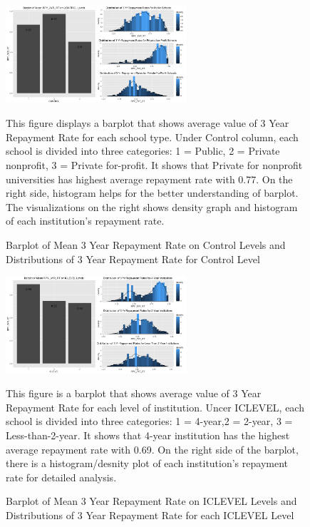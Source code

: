 \begin{figure}
  \centering
  \caption{Barplot of Mean 3 Year Repayment Rate on Control Levels and Distributions of 3 Year Repayment Rate for Control Level}
  \includegraphics[width=0.6\textwidth]{../images/eda/rpy3yr_control_barplot_histogram.png}
  \centering
  \newline
  
  \raggedright
This figure displays a barplot that shows average value of 3 Year Repayment Rate for each school type. Under Control column, each school is divided into three categories: 1 = Public, 2 = Private nonprofit, 3 = Private for-profit. It shows that Private for nonprofit universities has highest average repayment rate with 0.77. On the right side, histogram helps for the better understanding of barplot. The visualizations on the right shows density graph and histogram of each institution's repayment rate.
\end{figure}


\begin{figure}
  \caption{Barplot of Mean 3 Year Repayment Rate on ICLEVEL Levels and Distributions of 3 Year Repayment Rate for each ICLEVEL Level}
  \centering
  \includegraphics[width=0.6\textwidth]{../images/eda/iclevel_rpy3yr_barplot_histogram.png}
  \centering
  \newline
  
  \raggedright
This figure is a barplot that shows average value of 3 Year Repayment Rate for each level of institution. Uncer ICLEVEL, each school is divided into three categories: 1 = 4-year,2 = 2-year, 3 = Less-than-2-year. It shows that 4-year institution has the highest average repayment rate with 0.69. On the right side of the barplot, there is a histogram/desnity plot of each institution's repayment rate for detailed analysis.
\end{figure}

